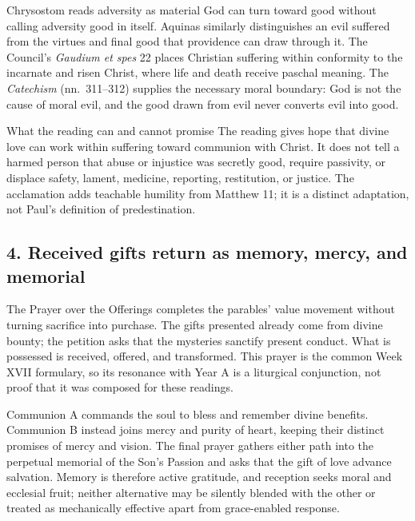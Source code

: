 \begin{deepstudy}
{Chrysostom reads adversity as material God can turn toward good without calling adversity good in itself. Aquinas similarly distinguishes an evil suffered from the virtues and final good that providence can draw through it. The Council's \emph{Gaudium et spes} 22 places Christian suffering within conformity to the incarnate and risen Christ, where life and death receive paschal meaning. The \emph{Catechism} (nn.~311--312) supplies the necessary moral boundary: God is not the cause of moral evil, and the good drawn from evil never converts evil into good.

\begin{studybox}{What the reading can and cannot promise}
The reading gives hope that divine love can work within suffering toward communion with Christ. It does not tell a harmed person that abuse or injustice was secretly good, require passivity, or displace safety, lament, medicine, reporting, restitution, or justice. The acclamation adds teachable humility from Matthew 11; it is a distinct adaptation, not Paul's definition of predestination.
\end{studybox}

\subsection*{4. Received gifts return as memory, mercy, and memorial\enspace{}}

The Prayer over the Offerings completes the parables' value movement without turning sacrifice into purchase. The gifts presented already come from divine bounty; the petition asks that the mysteries sanctify present conduct. What is possessed is received, offered, and transformed. This prayer is the common Week XVII formulary, so its resonance with Year A is a liturgical conjunction, not proof that it was composed for these readings.

Communion A commands the soul to bless and remember divine benefits. Communion B instead joins mercy and purity of heart, keeping their distinct promises of mercy and vision. The final prayer gathers either path into the perpetual memorial of the Son's Passion and asks that the gift of love advance salvation. Memory is therefore active gratitude, and reception seeks moral and ecclesial fruit; neither alternative may be silently blended with the other or treated as mechanically effective apart from grace-enabled response.

}
\end{deepstudy}
